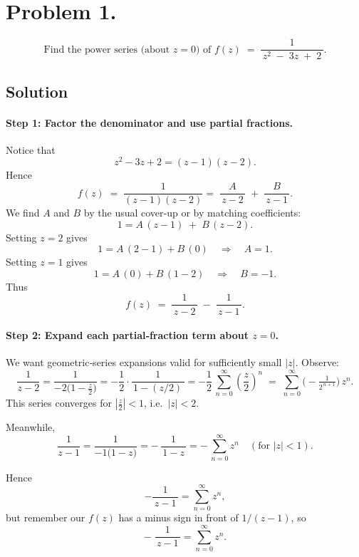 \documentclass[12pt]{article}
\theoremstyle{definition} %
\theoremstyle{plain} %
\begin{document}
      \section*{Problem 1.}
      \[
      \text{Find the power series (about $z=0$) of } 
      f(z) \;=\; \frac{1}{\,z^{2} \;-\; 3z \;+\; 2\,}.
      \]
      \subsection*{Solution}
      
      \paragraph{Step 1: Factor the denominator and use partial fractions.}
      Notice that
      \[
      z^2 - 3z + 2 
      = (z-1)(z-2).
      \]
      Hence
      \[
      f(z) \;=\; \frac{1}{(z-1)(z-2)} 
      =\; \frac{A}{\,z-2\,} \;+\; \frac{B}{\,z-1\,}.
      \]
      We find $A$ and $B$ by the usual cover‐up or by matching coefficients:
      \[
      1 = A\,(z-1) \;+\; B\,(z-2).
      \]
      Setting $z=2$ gives
      \[
      1 = A\,(2-1) + B\,(0) \quad \Longrightarrow \quad A = 1.
      \]
      Setting $z=1$ gives
      \[
      1 = A\,(0) + B\,(1-2) \quad \Longrightarrow \quad B = -1.
      \]
      Thus
      \[
      f(z) \;=\; \frac{1}{\,z-2\,} \;-\; \frac{1}{\,z-1\,}.
      \]
      
      \paragraph{Step 2: Expand each partial‐fraction term about $z=0$.}
      
      We want geometric‐series expansions valid for sufficiently small $|z|$.  Observe:
      \[
      \frac{1}{z-2}
      = \frac{1}{-2\bigl(1 - \tfrac{z}{2}\bigr)}
      = -\frac{1}{2}\cdot \frac{1}{\,1 - (z/2)\,}
      = -\frac{1}{2}\,\sum_{n=0}^\infty \left(\frac{z}{2}\right)^{n}
      \;=\;
      \sum_{n=0}^\infty \bigl(-\tfrac{1}{2^{\,n+1}}\bigr)\,z^n.
      \]
      This series converges for $\left|\frac{z}{2}\right|<1$, i.e.\ $|z|<2$.
      
      Meanwhile,
      \[
      \frac{1}{z-1}
      = \frac{1}{-1\bigl(1 - z\bigr)}
      = -\,\frac{1}{\,1 - z\,}
      = -\,\sum_{n=0}^\infty z^n
      \quad
      (\text{for }|z|<1).
      \]
      
      Hence
      \[
      -\frac{1}{\,z-1\,} 
      = \sum_{n=0}^\infty z^n,
      \]
      but remember our $f(z)$ has a minus sign in front of $1/(z-1)$, so
      \[
      -\;\frac{1}{\,z-1\,} 
      = \sum_{n=0}^\infty z^n.
      \]
      
\end{document}

